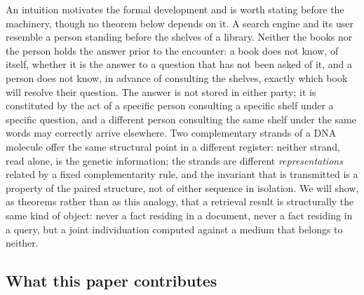 \documentclass[11pt,twocolumn,a4paper]{article}
\theoremstyle{frathm}
\theoremstyle{definition}
\theoremstyle{remark}
\begin{document}
An intuition motivates the formal development and is worth stating
before the machinery, though no theorem below depends on it. A search
engine and its user resemble a person standing before the shelves of a
library. Neither the books nor the person holds the answer prior to the
encounter: a book does not know, of itself, whether it is the answer to
a question that has not been asked of it, and a person does not know, in
advance of consulting the shelves, exactly which book will resolve their
question. The answer is not stored in either party; it is constituted by
the act of a specific person consulting a specific shelf under a specific
question, and a different person consulting the same shelf under the
same words may correctly arrive elsewhere. Two complementary strands of
a DNA molecule offer the same structural point in a different register:
neither strand, read alone, is the genetic information; the strands are
different \emph{representations} related by a fixed complementarity rule,
and the invariant that is transmitted is a property of the paired
structure, not of either sequence in isolation. We will show, as
theorems rather than as this analogy, that a retrieval result is
structurally the same kind of object: never a fact residing in a
document, never a fact residing in a query, but a joint individuation
computed against a medium that belongs to neither.

\subsection{What this paper contributes}
\end{document}
